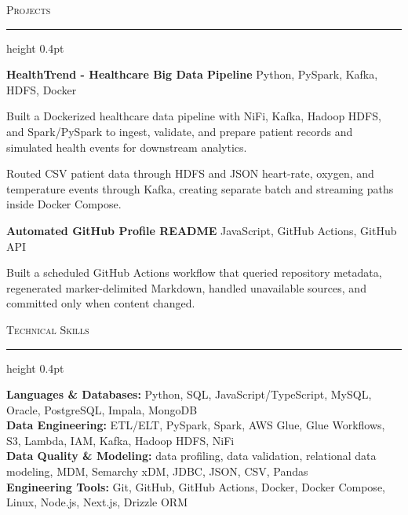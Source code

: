 \documentclass[letterpaper,11pt]{article}
\newcommand{\resumesection}[1]{%
  \par\vspace{2pt}%
  {\large\scshape #1}\par\vspace{2pt}%
  \hrule height 0.4pt\vspace{2pt}%
}
\newcommand{\projectHeading}[2]{
  \textbf{#1} \hfill #2
}
\begin{document}
\resumesection{Projects}
\projectHeading{HealthTrend - Healthcare Big Data Pipeline}{Python, PySpark, Kafka, HDFS, Docker}
\begin{tightitemize}
  \item Built a Dockerized healthcare data pipeline with NiFi, Kafka, Hadoop HDFS, and Spark/PySpark to ingest, validate, and prepare patient records and simulated health events for downstream analytics.
  \item Routed CSV patient data through HDFS and JSON heart-rate, oxygen, and temperature events through Kafka, creating separate batch and streaming paths inside Docker Compose.
\end{tightitemize}

\projectHeading{Automated GitHub Profile README}{JavaScript, GitHub Actions, GitHub API}
\begin{tightitemize}
  \item Built a scheduled GitHub Actions workflow that queried repository metadata, regenerated marker-delimited Markdown, handled unavailable sources, and committed only when content changed.
\end{tightitemize}

\resumesection{Technical Skills}
\textbf{Languages \& Databases:} Python, SQL, JavaScript/TypeScript, MySQL, Oracle, PostgreSQL, Impala, MongoDB\\
\textbf{Data Engineering:} ETL/ELT, PySpark, Spark, AWS Glue, Glue Workflows, S3, Lambda, IAM, Kafka, Hadoop HDFS, NiFi\\
\textbf{Data Quality \& Modeling:} data profiling, data validation, relational data modeling, MDM, Semarchy xDM, JDBC, JSON, CSV, Pandas\\
\textbf{Engineering Tools:} Git, GitHub, GitHub Actions, Docker, Docker Compose, Linux, Node.js, Next.js, Drizzle ORM
\end{document}
